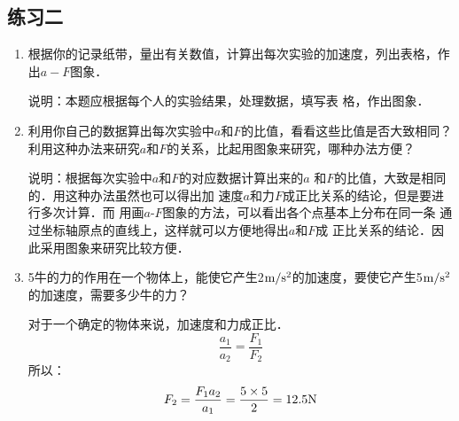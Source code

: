 \subsection{练习二}
\begin{enumerate}
	\item 根据你的记录纸带，量出有关数值，计算出每次实验的加速度，列出表格，作出$a-F$图象．
	 
    \begin{solution}
        说明：本题应根据每个人的实验结果，处理数据，填写表
        格，作出图象．
    \end{solution}
	\item 利用你自己的数据算出每次实验中$a$和$F$的比值，看看这些比值是否大致相同？利用这种办法来研究$a$和$F$的关系，比起用图象来研究，哪种办法方便？
	 
    \begin{solution}
        说明：根据每次实验中$a$和$F$的对应数据计算出来的$a$
        和$F$的比值，大致是相同的．用这种办法虽然也可以得出加
        速度$a$和力$F$成正比关系的结论，但是要进行多次计算．而
        用画$a$-$F$图象的方法，可以看出各个点基本上分布在同一条
        通过坐标轴原点的直线上，这样就可以方便地得出$a$和$F$成
        正比关系的结论．因此采用图象来研究比较方便．  
    \end{solution}
	\item 5牛的力的作用在一个物体上，能使它产生2$\text{m}/\text{s}^2$的加速度，要使它产生5$\text{m}/\text{s}^2$的加速度，需要多少牛的力？
	 
    \begin{solution}
对于一个确定的物体来说，加速度和力成正比．  
\[\frac{a_1}{a_2}=\frac{F_1}{F_2}\]
所以：
\[F_2=\frac{F_1a_2}{a_1}=\frac{5\times5}{2}=12.5{\rm N}\]      
    \end{solution}
\end{enumerate}



